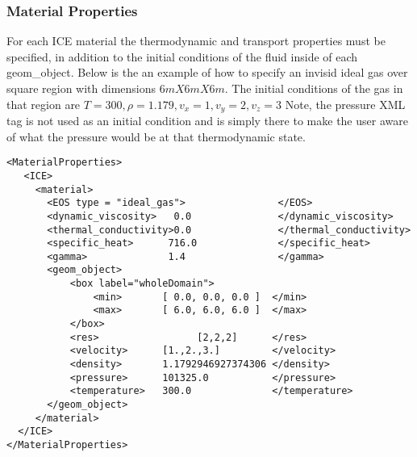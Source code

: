 \subsubsection{Material Properties}
For each ICE material the thermodynamic and transport properties must be
specified, in addition to the initial conditions of the fluid inside of
each geom\_object.  Below is the an example of how to specify an invisid
ideal gas over square region with dimensions $6m X 6m X 6m$.  The initial
conditions of the gas in that region are $T=300, \rho=1.179, v_x=1,v_y=2,
v_z=3$ \big{(}Note, the pressure XML tag is not used as an initial condition
and is simply there to make the user aware of what the pressure would be at
that thermodynamic state.\big{)}
%
\begin{Verbatim}[fontsize=\footnotesize]
<MaterialProperties>
   <ICE>
     <material>
       <EOS type = "ideal_gas">                </EOS>
       <dynamic_viscosity>   0.0               </dynamic_viscosity>
       <thermal_conductivity>0.0               </thermal_conductivity>
       <specific_heat>      716.0              </specific_heat>
       <gamma>              1.4                </gamma>
       <geom_object>
           <box label="wholeDomain">
               <min>       [ 0.0, 0.0, 0.0 ]  </min>
               <max>       [ 6.0, 6.0, 6.0 ]  </max>
           </box>
           <res>                 [2,2,2]      </res>
           <velocity>      [1.,2.,3.]         </velocity>
           <density>       1.1792946927374306 </density>
           <pressure>      101325.0           </pressure>     
           <temperature>   300.0              </temperature>
       </geom_object>
     </material>
  </ICE>       
</MaterialProperties>
\end{Verbatim}
